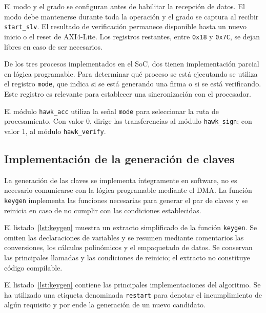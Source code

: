 El modo y el grado se configuran antes de habilitar la recepción de datos.
El modo debe mantenerse durante toda la operación y el grado se captura
al recibir \texttt{start\_slv}. El resultado de verificación permanece
disponible hasta un nuevo inicio o el reset de AXI4-Lite.
Los registros restantes, entre \texttt{0x18} y \texttt{0x7C},
se dejan libres en caso de ser necesarios.

De los tres procesos implementados en el SoC, dos tienen
implementación parcial en lógica programable. Para determinar qué proceso
se está ejecutando se utiliza el registro \texttt{mode}, que indica
si se está generando una firma o si se está verificando.
Este registro es relevante para establecer una sincronización
con el procesador.

El módulo \texttt{hawk\_acc} utiliza la señal \texttt{mode}
para seleccionar la ruta de procesamiento. Con valor 0,
dirige las transferencias al módulo \texttt{hawk\_sign};
con valor 1, al módulo \texttt{hawk\_verify}.

\subsection{Implementación de la generación de claves}

La generación de las claves se implementa íntegramente en software,
no es necesario comunicarse con la lógica programable mediante el DMA.
La función \texttt{keygen} implementa las funciones necesarias para
generar el par de claves y se reinicia en caso de no cumplir
con las condiciones establecidas.

El listado~\ref{lst:keygen} muestra un extracto simplificado de la función
\texttt{keygen}. Se omiten las declaraciones de variables y se resumen
mediante comentarios las conversiones, los cálculos polinómicos y el
empaquetado de datos. Se conservan las principales llamadas y las
condiciones de reinicio; el extracto no constituye código compilable.



El listado~\ref{lst:keygen} contiene las principales implementaciones
del algoritmo. Se ha utilizado una etiqueta denominada \texttt{restart}
para denotar el incumplimiento de algún requisito y por ende
la generación de un nuevo candidato.

